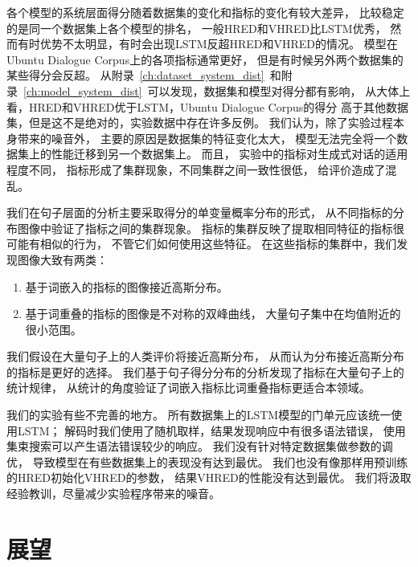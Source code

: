 各个模型的系统层面得分随着数据集的变化和指标的变化有较大差异，
比较稳定的是同一个数据集上各个模型的排名，
一般HRED和VHRED比LSTM优秀，
然而有时优势不太明显，有时会出现LSTM反超HRED和VHRED的情况。
模型在Ubuntu Dialogue Corpus上的各项指标通常更好，
但是有时候另外两个数据集的某些得分会反超。
从附录~\ref{ch:dataset_system_dist}~和附录~\ref{ch:model_system_dist}~可以发现，数据集和模型对得分都有影响，
从大体上看，HRED和VHRED优于LSTM，Ubuntu Dialogue Corpus的得分
高于其他数据集，但是这不是绝对的，实验数据中存在许多反例。
我们认为，除了实验过程本身带来的噪音外，
主要的原因是数据集的特征变化太大，
模型无法完全将一个数据集上的性能迁移到另一个数据集上。
而且，
实验中的指标对生成式对话的适用程度不同，
指标形成了集群现象，不同集群之间一致性很低，
给评价造成了混乱。

我们在句子层面的分析主要采取得分的单变量概率分布的形式，
从不同指标的分布图像中验证了指标之间的集群现象。
指标的集群反映了提取相同特征的指标很可能有相似的行为，
不管它们如何使用这些特征。
在这些指标的集群中，我们发现图像大致有两类：
\begin{enumerate}
    \item 基于词嵌入的指标的图像接近高斯分布。
    \item 基于词重叠的指标的图像是不对称的双峰曲线，
    大量句子集中在均值附近的很小范围。
\end{enumerate}
我们假设在大量句子上的人类评价将接近高斯分布，
从而认为分布接近高斯分布的指标是更好的选择。
我们基于句子得分分布的分析发现了指标在大量句子上的统计规律，
从统计的角度验证了词嵌入指标比词重叠指标更适合本领域。

我们的实验有些不完善的地方。
所有数据集上的LSTM模型的门单元应该统一使用LSTM；
解码时我们使用了随机取样，结果发现响应中有很多语法错误，
使用集束搜索可以产生语法错误较少的响应。
我们没有针对特定数据集做参数的调优，
导致模型在有些数据集上的表现没有达到最优。
我们也没有像\cite{VHRED}那样用预训练的HRED初始化VHRED的参数，
结果VHRED的性能没有达到最优。
我们将汲取经验教训，尽量减少实验程序带来的噪音。

\section{展望}\label{sec:future_work}
